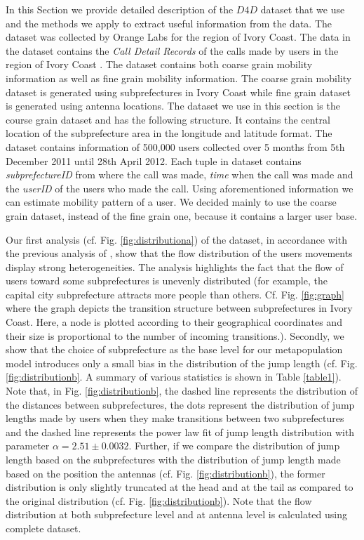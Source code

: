 \documentclass[review]{elsarticle}
\begin{document}
In this Section we provide detailed description of the $D4D$ dataset that we use and the methods we apply to extract useful information from the data. The dataset was collected by Orange Labs for the region of Ivory Coast. The data in the dataset contains the \emph{Call Detail Records} of the calls made by users in the region of Ivory Coast \cite{Blondel2012}. The dataset contains both coarse grain mobility information as well as fine grain mobility information. The coarse grain mobility dataset is generated using subprefectures in Ivory Coast while fine grain dataset is generated using antenna locations. The dataset we use in this section is the course grain dataset and has the following structure. It contains the central location of the subprefecture area in the longitude and latitude format. The dataset contains information of 500,000 users collected over 5 months from 5th December 2011 until 28th April 2012. Each tuple in dataset contains \emph{subprefectureID} from where the call was made, \emph{time} when the call was made and the \emph{userID} of the users who made the call. Using aforementioned information we can estimate mobility pattern of a user. We decided mainly to use the coarse grain dataset, instead of the fine grain one, because it contains a larger user base.

Our first analysis (cf. Fig. \ref{fig:distributiona}) of the dataset, in accordance with the previous analysis of \cite{gonzálezunderstanding2008, brockmannthe2006, colizzaepidemic2008}, show that the flow distribution of the users movements display strong heterogeneities. The analysis highlights the fact that the flow of users toward some subprefectures is unevenly distributed (for example, the capital city subprefecture attracts more people than others. Cf. Fig. \ref{fig:graph} where the graph depicts the transition structure between subprefectures in Ivory Coast. Here, a node is plotted according to their geographical coordinates and their size is proportional to the number of incoming transitions.). Secondly, we show that the choice of subprefecture as the base level for our metapopulation model introduces only a small bias in the distribution of the jump length (cf. Fig. \ref{fig:distributionb}. A summary of various statistics is shown in Table \ref{table1}). Note that, in Fig. \ref{fig:distributionb}, the dashed line represents the distribution of the distances between subprefectures, the dots represent the distribution of jump lengths made by users when they make transitions between two subprefectures and the dashed line represents the power law fit of jump length distribution with parameter $\alpha = 2.51 \pm 0.0032$. Further, if we compare the distribution of jump length based on the subprefectures with the distribution of jump length made based on the position the antennas (cf. Fig. \ref{fig:distributionb}), the former distribution is only slightly truncated at the head and at the tail as compared to the original distribution (cf. Fig. \ref{fig:distributionb}). Note that the flow distribution at both subprefecture level and at antenna level is calculated using complete dataset. 
\end{document}

